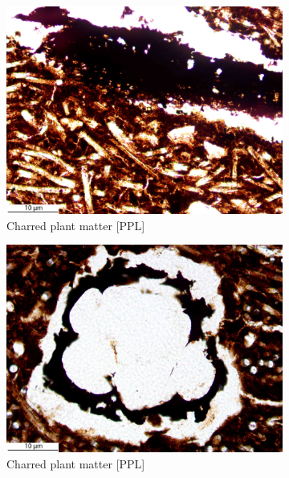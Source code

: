 \documentclass[a4paper]{article}
\begin{document}
\begin{figure}[H]
\begin{subfigure}[t]{.32\textwidth}
		\includegraphics[width=\textwidth]{ThinSections/99-1_20x_PPL.jpg}
		\caption{Charred plant matter [PPL]}
	\end{subfigure}\hspace{.1em}\hfill
	\begin{subfigure}[t]{.32\textwidth}
		\includegraphics[width=\textwidth]{ThinSections/99-2_20x_PPL.jpg}
		\caption{Charred plant matter [PPL]}
	\end{subfigure}\hspace{.1em}\hfill
	\begin{subfigure}[t]{.32\textwidth}

\end{subfigure}
\end{figure}
\end{document}
